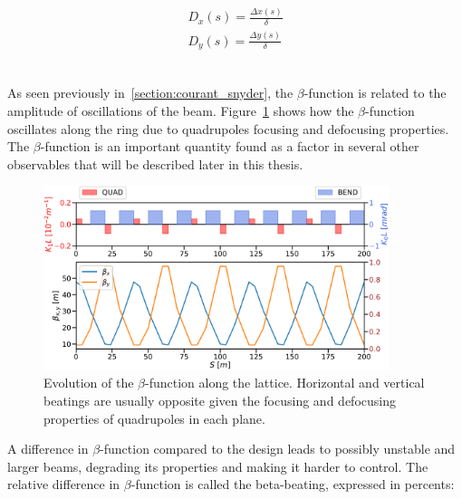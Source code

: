 \begin{equation}
    \begin{aligned}
    D_x(s) = \frac{\Delta x(s)}{\delta} \\
    D_y(s) = \frac{\Delta y(s)}{\delta} \\
    \end{aligned}
    \label{eq:coordinate_systems:dispersion}
\end{equation}



\subsection{}

As seen previously in~\ref{section:courant_snyder}, the $\beta$-function is related to the amplitude
of oscillations of the beam. Figure~\ref{fig:beam_optics:beta} shows how the $\beta$-function
oscillates along the ring due to quadrupoles focusing and defocusing properties.
The $\beta$-function is an important quantity found as a factor in several other observables that
will be described later in this thesis.


\begin{figure}[H]
    \centering
    \includegraphics[width=0.9\textwidth]{images/beta_function.pdf}
    \caption{Evolution of the $\beta$-function along the lattice. Horizontal and vertical beatings
    are usually opposite given the focusing and defocusing properties of quadrupoles in each plane.}
    \label{fig:beam_optics:beta}
\end{figure}

A difference in $\beta$-function compared to the design leads to possibly unstable and larger beams,
degrading its properties and making it harder to control. The relative difference in
$\beta$-function is called the beta-beating, expressed in percents: 

